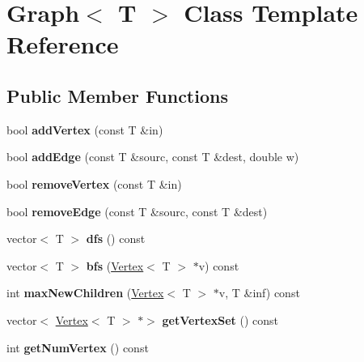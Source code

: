 \hypertarget{class_graph}{}\section{Graph$<$ T $>$ Class Template Reference}
\label{class_graph}
\subsection*{Public Member Functions}
\begin{DoxyCompactItemize}
\item 
\hypertarget{class_graph_a00be284ea2be3b3d0f0d2e493b70245b}{}\label{class_graph_a00be284ea2be3b3d0f0d2e493b70245b} 
bool {\bfseries add\+Vertex} (const T \&in)
\item 
\hypertarget{class_graph_ac61af3aafe6277215f5a3b3cc7d58ce2}{}\label{class_graph_ac61af3aafe6277215f5a3b3cc7d58ce2} 
bool {\bfseries add\+Edge} (const T \&sourc, const T \&dest, double w)
\item 
\hypertarget{class_graph_af9c903104ad69a7782979fa9caedf163}{}\label{class_graph_af9c903104ad69a7782979fa9caedf163} 
bool {\bfseries remove\+Vertex} (const T \&in)
\item 
\hypertarget{class_graph_a1106092a37366486cf55576f9ec01692}{}\label{class_graph_a1106092a37366486cf55576f9ec01692} 
bool {\bfseries remove\+Edge} (const T \&sourc, const T \&dest)
\item 
\hypertarget{class_graph_a911798b1a89f8c4ae90ba3eee849cff8}{}\label{class_graph_a911798b1a89f8c4ae90ba3eee849cff8} 
vector$<$ T $>$ {\bfseries dfs} () const
\item 
\hypertarget{class_graph_a56a5ea2c3aa7c0bd3849849be404a631}{}\label{class_graph_a56a5ea2c3aa7c0bd3849849be404a631} 
vector$<$ T $>$ {\bfseries bfs} (\hyperlink{class_vertex}{Vertex}$<$ T $>$ $\ast$v) const
\item 
\hypertarget{class_graph_a675559f8cddfe43bc416023ad9f28cfa}{}\label{class_graph_a675559f8cddfe43bc416023ad9f28cfa} 
int {\bfseries max\+New\+Children} (\hyperlink{class_vertex}{Vertex}$<$ T $>$ $\ast$v, T \&inf) const
\item 
\hypertarget{class_graph_a135e8f915af85904abca9eafaa4f13ce}{}\label{class_graph_a135e8f915af85904abca9eafaa4f13ce} 
vector$<$ \hyperlink{class_vertex}{Vertex}$<$ T $>$ $\ast$$>$ {\bfseries get\+Vertex\+Set} () const
\item 
\hypertarget{class_graph_a0853eac15cdf0f06d63f4b8a7820ec71}{}\label{class_graph_a0853eac15cdf0f06d63f4b8a7820ec71} 
int {\bfseries get\+Num\+Vertex} () const
$$
\end{DoxyCompactItemize}
